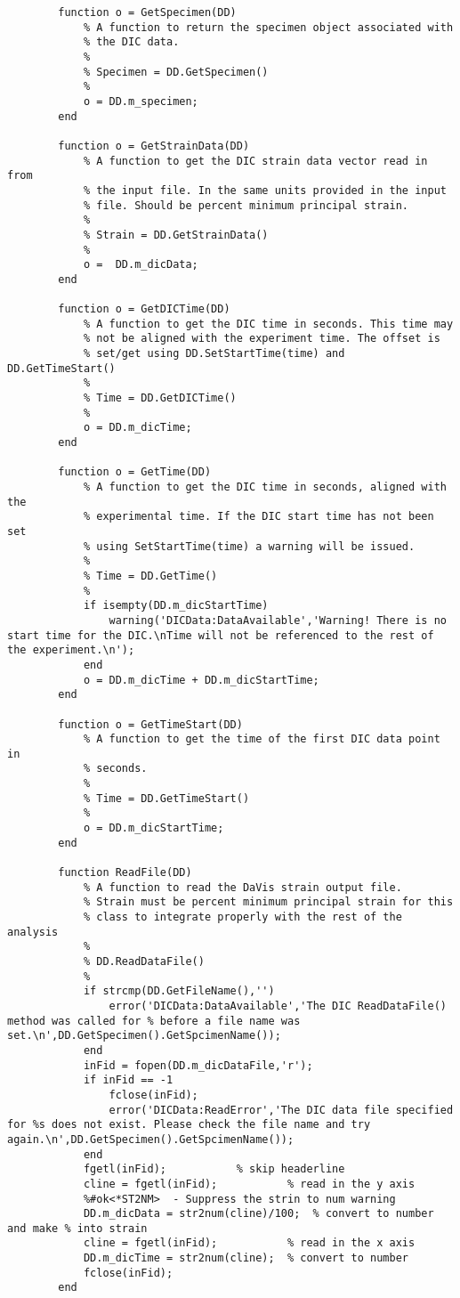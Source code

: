 \begin{lstlisting}
        function o = GetSpecimen(DD)
            % A function to return the specimen object associated with 
            % the DIC data.
            %
            % Specimen = DD.GetSpecimen()
            %
            o = DD.m_specimen;
        end

        function o = GetStrainData(DD)
            % A function to get the DIC strain data vector read in from
            % the input file. In the same units provided in the input
            % file. Should be percent minimum principal strain.
            %
            % Strain = DD.GetStrainData()
            %
            o =  DD.m_dicData;
        end
        
        function o = GetDICTime(DD)
            % A function to get the DIC time in seconds. This time may
            % not be aligned with the experiment time. The offset is
            % set/get using DD.SetStartTime(time) and DD.GetTimeStart()
            %
            % Time = DD.GetDICTime()
            %
            o = DD.m_dicTime;
        end
        
        function o = GetTime(DD)
            % A function to get the DIC time in seconds, aligned with the
            % experimental time. If the DIC start time has not been set
            % using SetStartTime(time) a warning will be issued.
            %
            % Time = DD.GetTime()
            %
            if isempty(DD.m_dicStartTime)
                warning('DICData:DataAvailable','Warning! There is no start time for the DIC.\nTime will not be referenced to the rest of the experiment.\n');
            end
            o = DD.m_dicTime + DD.m_dicStartTime;
        end
            
        function o = GetTimeStart(DD)
            % A function to get the time of the first DIC data point in
            % seconds.
            %
            % Time = DD.GetTimeStart()
            %
            o = DD.m_dicStartTime;
        end
        
        function ReadFile(DD)
            % A function to read the DaVis strain output file. 
            % Strain must be percent minimum principal strain for this 
            % class to integrate properly with the rest of the analysis
            %
            % DD.ReadDataFile()
            %
            if strcmp(DD.GetFileName(),'')
                error('DICData:DataAvailable','The DIC ReadDataFile() method was called for % before a file name was set.\n',DD.GetSpecimen().GetSpcimenName());
            end
            inFid = fopen(DD.m_dicDataFile,'r');
            if inFid == -1
                fclose(inFid);
                error('DICData:ReadError','The DIC data file specified for %s does not exist. Please check the file name and try again.\n',DD.GetSpecimen().GetSpcimenName());
            end
            fgetl(inFid);           % skip headerline
            cline = fgetl(inFid);           % read in the y axis
            %#ok<*ST2NM>  - Suppress the strin to num warning
            DD.m_dicData = str2num(cline)/100;  % convert to number and make % into strain
            cline = fgetl(inFid);           % read in the x axis
            DD.m_dicTime = str2num(cline);  % convert to number
            fclose(inFid);
        end
        

\end{lstlisting}
